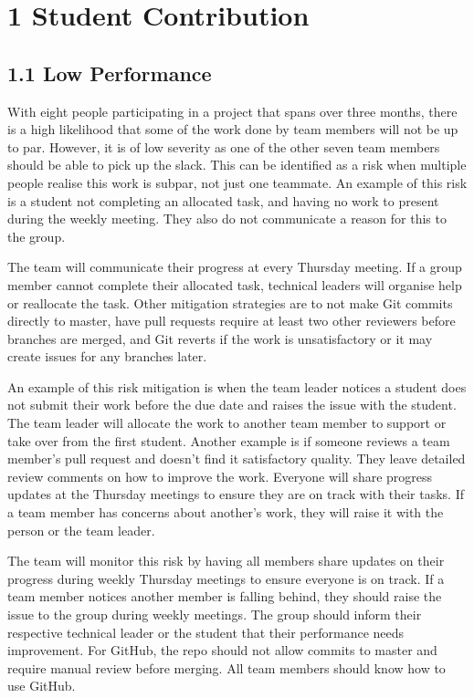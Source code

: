 \section*{1 Student Contribution}

\subsection*{1.1 Low Performance}

With eight people participating in a project that spans over three months, there is a high likelihood that some of the work done by team members will not be up to par. However, it is of low severity as one of the other seven team members should be able to pick up the slack. This can be identified as a risk when multiple people realise this work is subpar, not just one teammate. An example of this risk is a student not completing an allocated task, and having no work to present during the weekly meeting. They also do not communicate a reason for this to the group.

The team will communicate their progress at every Thursday meeting. If a group member cannot complete their allocated task, technical leaders will organise help or reallocate the task. Other mitigation strategies are to not make Git commits directly to master, have pull requests require at least two other reviewers before branches are merged, and Git reverts if the work is unsatisfactory or it may create issues for any branches later.

An example of this risk mitigation is when the team leader notices a student does not submit their work before the due date and raises the issue with the student. The team leader will allocate the work to another team member to support or take over from the first student. Another example is if someone reviews a team member’s pull request and doesn’t find it satisfactory quality. They leave detailed review comments on how to improve the work. Everyone will share progress updates at the Thursday meetings to ensure they are on track with their tasks. If a team member has concerns about another’s work, they will raise it with the person or the team leader.

The team will monitor this risk by having all members share updates on their progress during weekly Thursday meetings to ensure everyone is on track. If a team member notices another member is falling behind, they should raise the issue to the group during weekly meetings. The group should inform their respective technical leader or the student that their performance needs improvement. For GitHub, the repo should not allow commits to master and require manual review before merging. All team members should know how to use GitHub.

